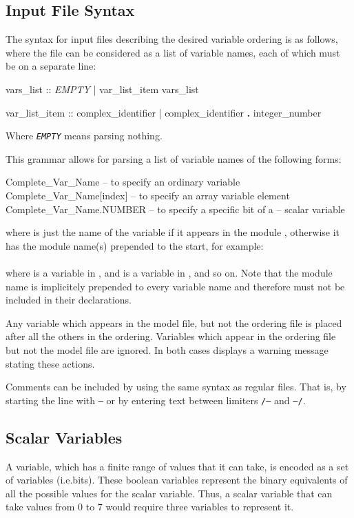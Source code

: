 \subsection{Input File Syntax}
\label{Input File Syntax}
%
The syntax for input files describing the desired variable ordering is
as follows, where the file can be considered as a list of variable
names, each of which must be on a separate line:
%
\begin{Grammar}
vars_list :: \textit{EMPTY}
         | var_list_item vars_list

var_list_item :: complex_identifier
             | complex_identifier \textbf{.} integer_number
\end{Grammar}
%
Where \textit{\texttt{EMPTY}} means parsing nothing.

This grammar allows for parsing a list of variable names of the
following forms:
%
\begin{nusmvCode}
Complete_Var_Name        -- to specify an ordinary variable
Complete_Var_Name[index] -- to specify an array variable element
Complete_Var_Name.NUMBER -- to specify a specific bit of a
                         -- scalar variable
\end{nusmvCode}
%
where  is just the name of the variable if
it appears in the module , otherwise it has the module
name(s) prepended to the start, for example:\\

\\

\noindent where  is a variable in , and
 is a variable in , and so
on. Note that the module name  is implicitely prepended
to every variable name and therefore must not be included in their
declarations.

\noindent Any variable which appears in the model file, but not the
ordering file is placed after all the others in the
ordering. Variables which appear in the ordering file but not the
model file are ignored. In both cases \nusmv displays a warning
message stating these actions.

Comments can be included by using the same syntax as regular \nusmv
files. That is, by starting the line with \texttt{--} or by entering
text between limiters \texttt{/--} and \texttt{--/}.

\subsection{Scalar Variables}
\label{Scalar Variables}
%
A variable, which has a finite range of values that it can take, is
encoded as a set of \Boolean variables (i.e.\@ bits). These boolean variables
represent the binary equivalents of all the possible values for the
scalar variable. Thus, a scalar variable that can take values from 0
to 7 would require three \Boolean variables to represent it.

